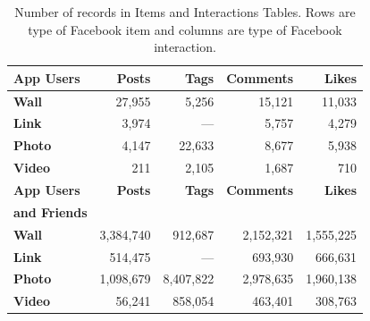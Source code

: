 \begin{table}
\centering
\begin{tabular}{|>{\small}l|>{\small}r|>{\small}r|>{\small}r|>{\small}r|}
\hline
\textbf{App Users} & \textbf{Posts} & \textbf{Tags} & \textbf{Comments} & \textbf{Likes} \\
\hline
\textbf{Wall} & 27,955 & 5,256 & 15,121 & 11,033 \\
\hline
\textbf{Link} & 3,974 & --- & 5,757 & 4,279 \\
\hline
\textbf{Photo} & 4,147 & 22,633 & 8,677 & 5,938 \\
\hline
\textbf{Video} & 211 & 2,105 & 1,687 & 710 \\
\hline
\hline
\textbf{App Users} & \textbf{Posts} & \textbf{Tags} & \textbf{Comments} & \textbf{Likes} \\
\textbf{and Friends} & & & & \\
\hline
\textbf{Wall} & 3,384,740 & 912,687 & 2,152,321 & 1,555,225 \\
\hline
\textbf{Link} & 514,475 & --- & 693,930 & 666,631 \\
\hline
\textbf{Photo} & 1,098,679 & 8,407,822 & 2,978,635 & 1,960,138 \\
\hline
\textbf{Video} & 56,241 & 858,054 & 463,401 & 308,763 \\
\hline
\end{tabular}
\caption{Number of records in Items and Interactions Tables. Rows are type of Facebook item and columns are type of Facebook interaction.}
\label{tab:interactions}
\end{table}




